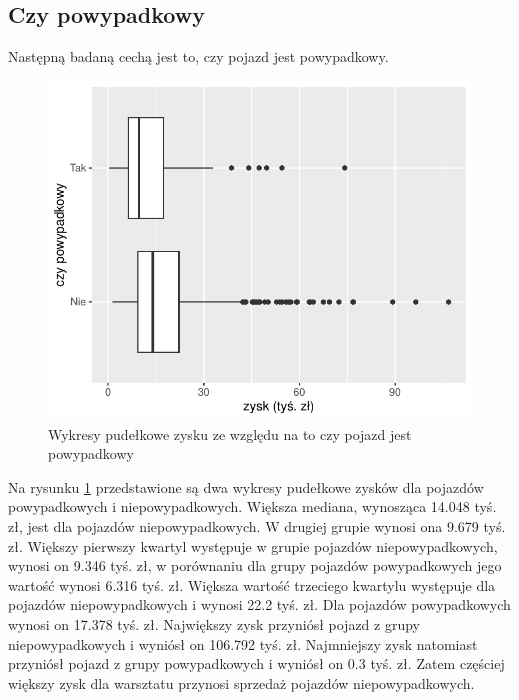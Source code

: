 \documentclass{article}\usepackage[]{graphicx}\usepackage[]{xcolor}
\makeatletter
\def\maxwidth{ %
  \ifdim\Gin@nat@width>\linewidth
    \linewidth
  \else
    \Gin@nat@width
  \fi
}
\newenvironment{knitrout}{}{} %
\makeatother
\begin{document}
\subsection{Czy powypadkowy}

Następną badaną cechą jest to, czy pojazd jest powypadkowy.

\begin{knitrout}
\color{fgcolor}\begin{figure}[H]

{\centering \includegraphics[width=\maxwidth]{figure/fig_wypadkowy-1} 

}

\caption[Wykresy pudełkowe zysku ze względu na to czy pojazd jest powypadkowy]{Wykresy pudełkowe zysku ze względu na to czy pojazd jest powypadkowy}\label{fig:fig_wypadkowy}
\end{figure}

\end{knitrout}

Na rysunku \ref{fig:fig_wypadkowy} przedstawione są dwa wykresy pudełkowe zysków dla pojazdów powypadkowych i niepowypadkowych. Większa mediana, wynosząca 14.048 tyś. zł, jest dla pojazdów niepowypadkowych. W drugiej grupie wynosi ona 9.679 tyś. zł. 
Większy pierwszy kwartyl występuje w grupie pojazdów niepowypadkowych, wynosi on 9.346 tyś. zł, w porównaniu dla grupy pojazdów powypadkowych jego wartość wynosi 6.316 tyś. zł.
Większa wartość trzeciego kwartylu występuje dla pojazdów niepowypadkowych i wynosi 22.2 tyś. zł. Dla pojazdów powypadkowych wynosi on 17.378 tyś. zł.
Największy zysk przyniósł pojazd z grupy niepowypadkowych i wyniósł on 106.792 tyś. zł. 
Najmniejszy zysk natomiast przyniósł pojazd z grupy powypadkowych i wyniósł on 0.3 tyś. zł. Zatem częściej większy zysk dla warsztatu przynosi sprzedaż pojazdów niepowypadkowych. 
\end{document}
